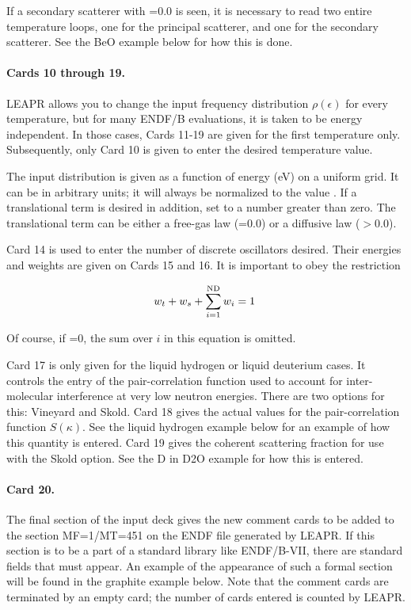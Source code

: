 If a secondary scatterer with =0.0 is seen, it is necessary
to read two entire temperature loops, one for the principal scatterer,
and one for the secondary scatterer.  See the BeO example
below for how this is done.

\paragraph{Cards 10 through 19.}
LEAPR allows you to change the input frequency distribution $\rho(\epsilon)$
for every temperature, but for many ENDF/B evaluations, it is taken
to be energy independent.  In those cases, Cards 11-19 are given for the
first temperature only.  Subsequently, only Card 10 is given to enter
the desired temperature value.

The input distribution is given as a function of energy (eV) on a uniform
grid.  It can be in arbitrary units; it will always be normalized to the
value .  If a translational term is desired in addition, set
 to a number greater than zero.  The translational term can
be either a free-gas law (=0.0) or a diffusive law ($>$0.0).

Card 14 is used to enter the number of discrete oscillators desired.
Their energies and weights are given on Cards 15 and 16.  It is
important to obey the restriction

\begin{equation}
   w_t + w_s + \sum_{i=1}^{\rm ND} w_i = 1\,
\end{equation}

\noindent
Of course, if =0, the sum over $i$ in this equation is omitted.

Card 17 is only given for the liquid hydrogen
or liquid deuterium cases.  It controls the entry of the
pair-correlation function used to account for inter-molecular
interference at very low neutron
energies.  There are two options for this: Vineyard
and Skold.  Card 18 gives the actual values for the
pair-correlation function $S(\kappa)$.
See the liquid hydrogen example below for an example of how this quantity
is entered.  Card 19 gives the coherent scattering fraction for use
with the Skold option.  See the D in D2O example for how this is
entered.

\paragraph{Card 20.}
The final section of the input deck gives the new comment cards to be
added to the section MF=1/MT=451 on the ENDF file generated by LEAPR.
If this section is to be a part of a standard library like ENDF/B-VII,
there are standard fields that must appear.  An example of the appearance
of such a formal section will be found in the graphite example below.
Note that the comment cards are terminated by an empty card;  the number
of cards entered is counted by LEAPR.

